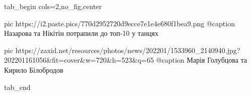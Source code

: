  
 
 
 
 

\ifcmt
  tab_begin cols=2,no_fig,center

     pic https://i2.paste.pics/770d2952720d9ecce7e1e4e680f1bea9.png
		 @caption Назарова та Нікітін потрапили до топ-10 у танцях

		 pic https://zaxid.net/resources/photos/news/202201/1533960_2140940.jpg?202201161056&fit=cover&w=720&h=523&q=65
		 @caption Марія Голубцова та Кирило Білобродов

  tab_end
\fi
